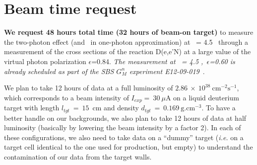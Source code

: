 \section{Beam time request}

{\bf We request 48 hours total time (32 hours of beam-on target)} to measure the two-photon effect (and \gen~in one-photon approximation) 
at \qsq~= 4.5 \gevcsq~through a measurement of the cross sections of the reaction D(e,e'N) at a large value of the virtual photon polarization $\epsilon$=0.84.
{\em The measurement at \qsq~= 4.5 \gevcsq,~$\epsilon$=0.60 is already scheduled as part of the SBS $G_M^n$ experiment E12-09-019}~\cite{E12-09-019}.

We plan to take 12 hours of data at a full luminosity of $2.86~\times~10^{38}~\mathrm{cm}^{-2}\mathrm{s}^{-1}$, which corresponds to a beam intensity of $I_{exp} =~30~\mu$A on a liquid deuterium target with length $l_{tgt}~=~15$~cm and density $d_{tgt}~=~0.169~\mathrm{g.cm}^{-3}$. 
To have a better handle on our backgrounds, we also plan to take 12 hours of data at half luminosity (basically by lowering the beam intensity by a factor 2).
In each of these configurations, we also need to take data on a ``dummy'' target ({\it i.e.} on a target cell identical to the one used for production, but empty) to understand the contamination of our data from the target walls.

